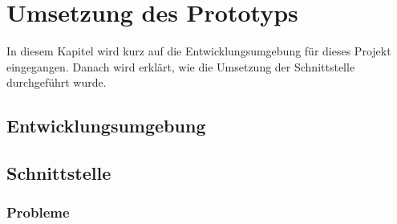 %
%

\chapter{Umsetzung des Prototyps}\label{chap.umsetzung}
In diesem Kapitel wird kurz auf die Entwicklungsumgebung für dieses Projekt eingegangen. Danach wird erklärt, wie die Umsetzung der Schnittstelle durchgeführt wurde.

\section{Entwicklungsumgebung}\label{entwicklungsumgebung}

\section{Schnittstelle}\label{impl_interface}

\subsection{Probleme}
